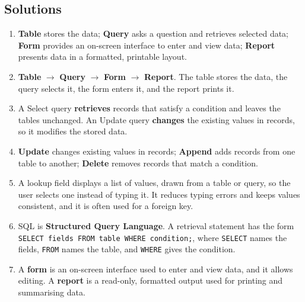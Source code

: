 \documentclass[11pt]{article}
\begin{document}
\subsection*{Solutions}
\begingroup\small
\begin{enumerate}[label=\arabic*.]
  \item \textbf{Table} stores the data; \textbf{Query} asks a question and
    retrieves selected data; \textbf{Form} provides an on-screen interface to
    enter and view data; \textbf{Report} presents data in a formatted,
    printable layout.
  \item \textbf{Table} $\rightarrow$ \textbf{Query} $\rightarrow$
    \textbf{Form} $\rightarrow$ \textbf{Report}. The table stores the data,
    the query selects it, the form enters it, and the report prints it.
  \item A Select query \textbf{retrieves} records that satisfy a condition
    and leaves the tables unchanged. An Update query \textbf{changes} the
    existing values in records, so it modifies the stored data.
  \item \textbf{Update} changes existing values in records;
    \textbf{Append} adds records from one table to another;
    \textbf{Delete} removes records that match a condition.
  \item A lookup field displays a list of values, drawn from a table or
    query, so the user selects one instead of typing it. It reduces typing
    errors and keeps values consistent, and it is often used for a foreign
    key.
  \item SQL is \textbf{Structured Query Language}. A retrieval statement has
    the form \texttt{SELECT fields FROM table WHERE condition;}, where
    \texttt{SELECT} names the fields, \texttt{FROM} names the table, and
    \texttt{WHERE} gives the condition.
  \item A \textbf{form} is an on-screen interface used to enter and view
    data, and it allows editing. A \textbf{report} is a read-only, formatted
    output used for printing and summarising data.
\end{enumerate}
\endgroup
\end{document}
